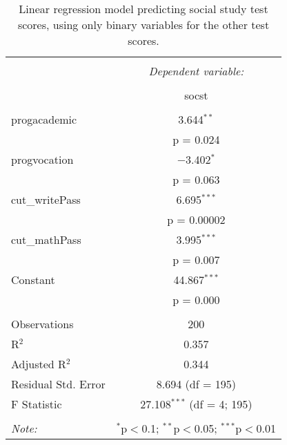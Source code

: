 
\begin{table}[!htbp] \centering 
  \caption{Linear regression model predicting social study test scores, 
          using only binary variables for the other test scores.} 
  \label{tab::lm_cut_socst} 
\begin{tabular}{@{\extracolsep{5pt}}lc} 
\\[-1.8ex]\hline 
\hline \\[-1.8ex] 
 & \multicolumn{1}{c}{\textit{Dependent variable:}} \\ 
\cline{2-2} 
\\[-1.8ex] & socst \\ 
\hline \\[-1.8ex] 
 progacademic & 3.644$^{**}$ \\ 
  & p = 0.024 \\ 
  progvocation & $-$3.402$^{*}$ \\ 
  & p = 0.063 \\ 
  cut\_writePass & 6.695$^{***}$ \\ 
  & p = 0.00002 \\ 
  cut\_mathPass & 3.995$^{***}$ \\ 
  & p = 0.007 \\ 
  Constant & 44.867$^{***}$ \\ 
  & p = 0.000 \\ 
 \hline \\[-1.8ex] 
Observations & 200 \\ 
R$^{2}$ & 0.357 \\ 
Adjusted R$^{2}$ & 0.344 \\ 
Residual Std. Error & 8.694 (df = 195) \\ 
F Statistic & 27.108$^{***}$ (df = 4; 195) \\ 
\hline 
\hline \\[-1.8ex] 
\textit{Note:}  & \multicolumn{1}{r}{$^{*}$p$<$0.1; $^{**}$p$<$0.05; $^{***}$p$<$0.01} \\ 
\end{tabular} 
\end{table} 
